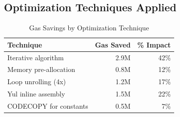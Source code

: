 \subsection{Optimization Techniques Applied}

\begin{table}[h]
\centering
\caption{Gas Savings by Optimization Technique}
\begin{tabular}{lrr}
\toprule
Technique & Gas Saved & \% Impact \\
\midrule
Iterative algorithm & 2.9M & 42\% \\
Memory pre-allocation & 0.8M & 12\% \\
Loop unrolling (4x) & 1.2M & 17\% \\
Yul inline assembly & 1.5M & 22\% \\
CODECOPY for constants & 0.5M & 7\% \\
\bottomrule
\end{tabular}
\end{table}

